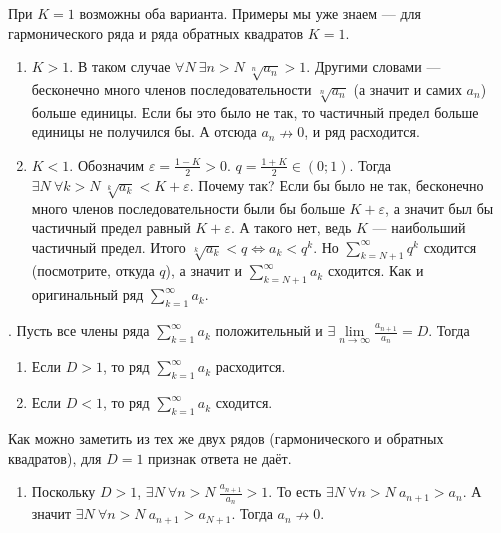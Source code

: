 \documentclass{article}
\begin{document}
\begin{itemize}
\begin{Comment}
        \end{Comment}
        \begin{Comment}
            При $K=1$ возможны оба варианта. Примеры мы уже знаем --- для гармонического ряда и ряда обратных квадратов $K=1$.
        \end{Comment}
        \begin{Proof}
            \begin{enumerate}
                \item $K>1$. В таком случае $\forall N~\exists n>N~\sqrt[n]{a_n}>1$. Другими словами --- бесконечно много членов последовательности $\sqrt[n]{a_n}$ (а значит и самих $a_n$) больше единицы. Если бы это было не так, то частичный предел больше единицы не получился бы. А отсюда $a_n\nrightarrow0$, и ряд расходится.
                \item $K<1$. Обозначим $\varepsilon=\frac{1-K}2>0$. $q=\frac{1+K}2\in(0;1)$. Тогда $\exists N~\forall k>N~\sqrt[k]{a_k}<K+\varepsilon$. Почему так? Если бы было не так, бесконечно много членов последовательности были бы больше $K+\varepsilon$, а значит был бы частичный предел равный $K+\varepsilon$. А такого нет, ведь $K$ --- наибольший частичный предел. Итого $\sqrt[k]{a_k}<q\Leftrightarrow a_k<q^k$. Но $\sum\limits_{k=N+1}^\infty q^k$ сходится (посмотрите, откуда $q$), а значит и $\sum\limits_{k=N+1}^\infty a_k$ сходится. Как и оригинальный ряд $\sum\limits_{k=1}^\infty a_k$.    
            \end{enumerate}
        \end{Proof}
        \thm {}. Пусть все члены ряда $\sum\limits_{k=1}^\infty a_k$ положительный и $\exists\lim\limits_{n\to\infty}\frac{a_{n+1}}{a_n}=D$. Тогда
        \begin{enumerate}
            \item Если $D>1$, то ряд $\sum\limits_{k=1}^\infty a_k$ расходится.
            \item Если $D<1$, то ряд $\sum\limits_{k=1}^\infty a_k$ сходится.
        \end{enumerate}
        \begin{Comment}
            Как можно заметить из тех же двух рядов (гармонического и обратных квадратов), для $D=1$ признак ответа не даёт.
        \end{Comment}
        \begin{Proof}
            \begin{enumerate}
                \item Поскольку $D>1$, $\exists N~\forall n>N~\frac{a_{n+1}}{a_n}>1$. То есть $\exists N~\forall n>N~a_{n+1}>a_n$. А значит $\exists N~\forall n>N~a_{n+1}>a_{N+1}$. Тогда $a_n\nrightarrow0$.

\end{enumerate}
\end{Proof}
\end{itemize}
\end{document}
